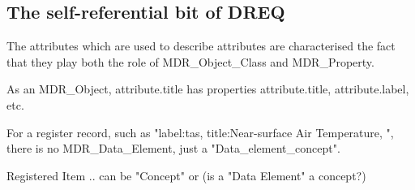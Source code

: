 \documentclass[]{elsarticle}
\begin{document}
\subsection{The self-referential bit of DREQ}

The attributes which are used to describe attributes are characterised the fact that they play both the role of MDR_Object_Class and MDR_Property.

As an MDR_Object, attribute.title has properties attribute.title, attribute.label, etc.

For a register record, such as "label:tas, title:Near-surface Air Temperature, ", there is no MDR_Data_Element, just a "Data_element_concept".


Registered Item .. can be "Concept" or (is a "Data Element" a concept?)
\end{document}
